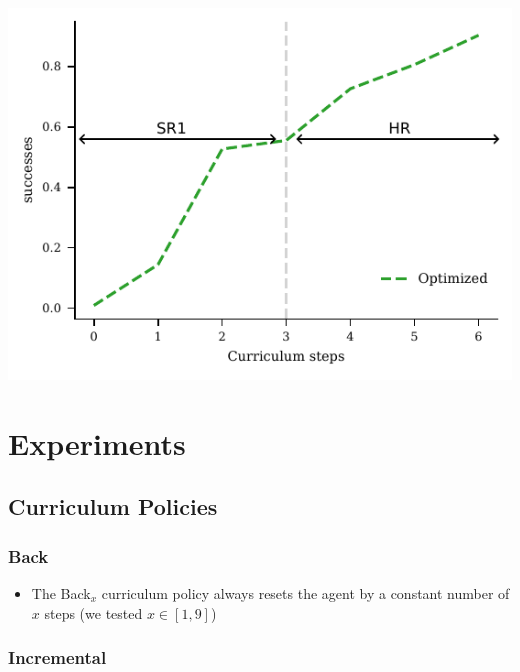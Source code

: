 \documentclass[a0,portrait]{a0poster}
\begin{document}
\begin{multicols}{3}
\begin{minipage}{\columnwidth}\begin{center}
    \includegraphics[width=\linewidth]{assets/optimized_switch.pdf}
\end{center}\end{minipage}

\section{Experiments}

\subsection{Curriculum Policies}

\subsubsection{Back}

\begin{itemize}
    \item The Back$_x$ curriculum policy always resets the agent by a constant number of $x$ steps (we tested $x\in[1,9]$)
\end{itemize}

\subsubsection{Incremental}


\end{multicols}
\end{document}
